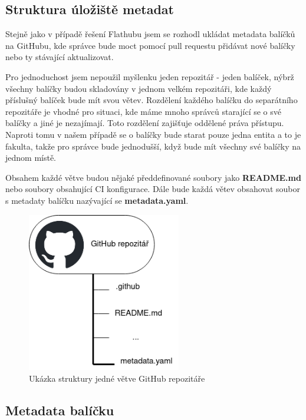 \documentclass[
  digital,     %
  oneside,     %
  nosansbold,  %
  nocolorbold, %
  lof,         %
  lot,         %
]{fithesis4}
\begin{document}
\subsection{Struktura úložiště metadat}
\label{item:2.3.1}

Stejně jako v případě řešení Flathubu jsem se rozhodl ukládat metadata
balíčků na GitHubu, kde správce bude moct pomocí pull requestu přidávat
nové balíčky nebo ty stávající aktualizovat.

Pro jednoduchost jsem nepoužil myšlenku jeden repozitář - jeden balíček,
nýbrž všechny balíčky budou skladovány v jednom velkém repozitáři, kde
každý příslušný balíček bude mít svou větev. Rozdělení 
každého balíčku do separátního repozitáře je vhodné pro situaci, kde
máme mnoho správců starající se o své balíčky a jiné je nezajímají.
Toto rozdělení zajišťuje oddělené práva přístupu. Naproti tomu v
našem případě se o balíčky bude starat pouze jedna entita a to je
fakulta, takže pro správce bude jednodušší, když bude mít všechny
své balíčky na jednom místě.

Obsahem každé větve budou nějaké předdefinované soubory jako 
\textbf{README.md} nebo soubory obsahující CI konfigurace. Dále bude 
každá větev obsahovat soubor s metadaty balíčku nazývající se
\textbf{metadata.yaml}.

\begin{figure}[H]
    \begin{center}
      \includegraphics[width=0.6\textwidth]{images/png/repository_structure.png}
    \end{center}
    \caption{Ukázka struktury jedné větve GitHub repozitáře}
    \label{fig:repository_structure}
\end{figure}


\subsection{Metadata balíčku}
\end{document}
